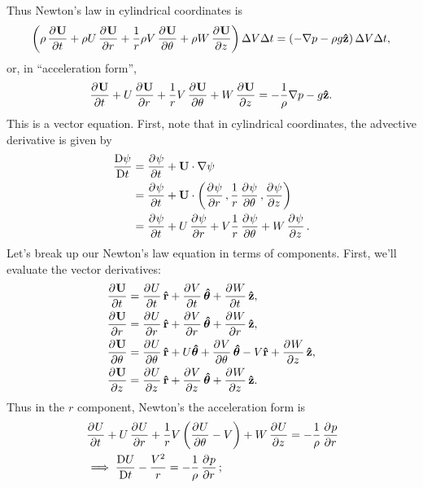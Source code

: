 \documentclass{article}
\def\*#1{\mathbf{#1}}
\newcommand{\rhat}{\mathbf{\hat{r}}}
\newcommand{\thetahat}{\boldsymbol{\hat{\theta}}}
\newcommand{\zhat}{\mathbf{\hat{z}}}
\newcommand{\dadvd}[2]{\dfrac{\text{D} #1}{\text{D} #2}} %
\begin{document}
%
Thus Newton's law in cylindrical coordinates is
%
\begin{equation*}
    \del{
        \rho \dpd{\*U}{t}
        + \rho U \dpd{\*U}{r}
        + \frac{1}{r} \rho V \dpd{\*U}{\theta}
        + \rho W \dpd{\*U}{z}
    } \Delta V \Delta t
    =
    \del{- \nabla p - \rho g \zhat} \Delta V \Delta t
    ,
\end{equation*}
%
or, in ``acceleration form'',
%
\begin{equation*}
    \dpd{\*U}{t}
    + U \dpd{\*U}{r}
    + \frac{1}{r} V \dpd{\*U}{\theta}
    + W \dpd{\*U}{z}
    =
    - \frac{1}{\rho} \nabla p - g \zhat
    .
\end{equation*}
%
This is a vector equation. First, note that in cylindrical coordinates,
the advective derivative is given by
%
\begin{align*}
    \dadvd{\psi}{t}
        &= \dpd{\psi}{t} + \*U \cdot \nabla \psi \\
        &= \dpd{\psi}{t} + \*U \cdot
            \del{
                \dpd{\psi}{r},
                \frac{1}{r} \dpd{\psi}{\theta},
                \dpd{\psi}{z}
            } \\
        &=
            \dpd{\psi}{t}
            + U \dpd{\psi}{r}
            + V \frac{1}{r} \dpd{\psi}{\theta}
            + W \dpd{\psi}{z}
        .
\end{align*}
%
Let's break up our Newton's law equation in terms of components.
First, we'll evaluate the vector derivatives:
%
\begin{align*}
    \dpd{\*U}{t} &= \dpd{U}{t} \rhat + \dpd{V}{t} \thetahat + \dpd{W}{t} \zhat, \\
    \dpd{\*U}{r}
        &= \dpd{U}{r} \rhat
            + \dpd{V}{r} \thetahat
            + \dpd{W}{r} \zhat
    ,
    \\
    \dpd{\*U}{\theta}
        &= \dpd{U}{\theta} \rhat
            + U \thetahat
            + \dpd{V}{\theta} \thetahat
            - V \rhat
            + \dpd{W}{z} \zhat
    ,
    \\
    \dpd{\*U}{z} &= \dpd{U}{z} \rhat + \dpd{V}{z} \thetahat + \dpd{W}{z} \zhat
    .
\end{align*}
%
Thus in the $r$ component, Newton's the acceleration form is
%
\begin{align*}
    &\dpd{U}{t}
    + U \dpd{U}{r}
    + \frac{1}{r} V \del{\dpd{U}{\theta} - V}
    + W \dpd{U}{z}
    =
    - \frac{1}{\rho} \dpd{p}{r}
    \\
    &\implies
    \dadvd{U}{t} - \frac{V^2}{r}
    =
    - \frac{1}{\rho} \dpd{p}{r}
    ;
\end{align*}
\end{document}
